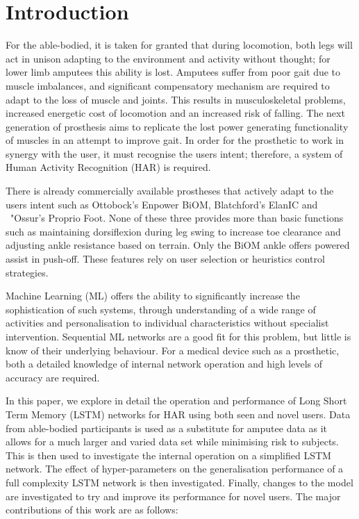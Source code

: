 \documentclass[sensors,article,submit,moreauthors,pdftex]{Definitions/mdpi}
\begin{document}


\section{Introduction}
For the able-bodied, it is taken for granted that during locomotion, both legs will act in unison adapting to the environment and activity without thought; for lower limb amputees this ability is lost. Amputees suffer from poor gait due to muscle imbalances, and significant compensatory mechanism are required to adapt to the loss of muscle and joints\cite{Silverman2008}. This results in musculoskeletal problems, increased energetic cost of locomotion and an increased risk of falling\cite{Herr2012, Piazza2017, McDonald2018}. The next generation of prosthesis aims to replicate the lost power generating functionality of muscles in an attempt to improve gait. In order for the prosthetic to work in synergy with the user, it must recognise the users intent; therefore, a system of Human Activity Recognition (HAR) is required.

There is already commercially available prostheses that actively adapt to the users intent such as Ottobock's Enpower BiOM\cite{Enpower}, Blatchford's ElanIC\cite{ElanIC} and \ "Ossur's Proprio Foot\cite{Proprio}. None of these three provides more than basic functions such as maintaining dorsiflexion during leg swing to increase toe clearance and adjusting ankle resistance based on terrain. Only the BiOM ankle offers powered assist in push-off. These features rely on user selection or heuristics control strategies.

Machine Learning (ML) offers the ability to significantly increase the sophistication of such systems, through understanding of a wide range of activities and personalisation to individual characteristics without specialist intervention\cite{Labarriere2020}. Sequential ML networks are a good fit for this problem, but little is know of their underlying behaviour. For a medical device such as a prosthetic, both a detailed knowledge of internal network operation and high levels of accuracy are required. 

In this paper, we explore in detail the operation and performance of Long Short Term Memory (LSTM) networks for HAR using both seen and novel users. Data from able-bodied participants is used as a substitute for amputee data as it allows for a much larger and varied data set while minimising risk to subjects. This is then used to investigate the internal operation on a simplified LSTM network. The effect of hyper-parameters on the generalisation performance of a full complexity LSTM network is then investigated. Finally, changes to the model are investigated to try and improve its performance for novel users. The major contributions of this work are as follows:
\end{document}
